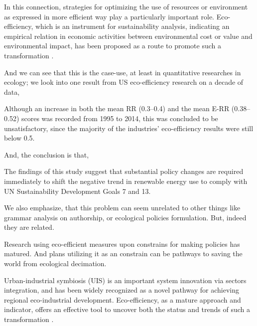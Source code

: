 \documentclass[
12pt,				%
openright,			%
oneside,			%
a4paper,			%
brazil,				%
english,			%
]{abntex2}
\begin{document}
\begin{citacao}
 In this connection, strategies for optimizing the use of resources or
environment as expressed in more efficient way play a
particularly important role. Eco-efficiency, which is an instrument for sustainability analysis, indicating an empirical
relation in economic activities between environmental cost
or value and environmental impact, has been proposed as a
route to promote such a transformation \cite{mickwitz2006regional}.
\end{citacao}

And we can see that this is the case-use, at least in quantitative
researches in ecology; we look into one result from US eco-efficiency research on a decade of data,

\begin{citacao}
 Although an increase in both the mean RR (0.3–0.4) and the mean E-RR
 (0.38–0.52) scores was recorded from 1995 to 2014, this was concluded
 to be unsatisfactory, since the majority of the industries’
 eco-efficiency results were still below 0.5. \cite{ezici2020assessing}
\end{citacao}

And, the conclusion is that,

\begin{citacao}
The findings of this study suggest that substantial policy changes are
required immediately to shift the negative trend in renewable energy
use to comply with UN Sustainability Development Goals 7 and 13. \cite{ezici2020assessing}
\end{citacao}



We also emphasize, that this problem can seem unrelated to other
things like grammar analysis on authorship, or ecological policies
formulation. But, indeed they are related. 

Research using eco-efficient measures upon constrains for making
policies has matured. And plans utilizing it as an constrain can be
pathways to saving the world from ecological decimation.

\begin{citacao}
Urban-industrial symbiosis (UIS) is an important system innovation via
sectors integration, and has been widely recognized as a novel pathway
for achieving regional eco-industrial development. Eco-efficiency, as
a mature approach and indicator, offers an effective tool to uncover
both the status and trends of such a transformation \cite{bian2020sectoral}.
\end{citacao}
\end{document}
